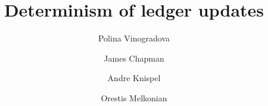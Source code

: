 \documentclass[a4paper,UKenglish,cleveref,autoref,thm-restate,authorcolumns]{lipics-v2021}
\title{Determinism of ledger updates} %
\author{Polina  Vinogradova}{IOG} {polina.vinogradova@iohk.io}{}{}
\author{James	Chapman}{IOG} {james.chapman@iohk.io}{}{}
\author{Andre	Knispel}{IOG} {andre.knispel@iohk.io}{}{}
\author{Orestis	Melkonian}{IOG \& University of Edinburgh, UK} {orestis.melkonian@ed.ac.uk}{}{}
\begin{document}
\maketitle

\begin{abstract}
\end{abstract}








\end{document}
